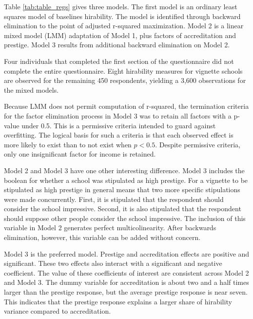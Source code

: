 \documentclass[review]{elsarticle}
\begin{document}


Table \ref{tab:table_regs} gives three models.
The first model is an ordinary least squares model of baselines hirability.
The model is identified through backward elimination to the point of adjusted r-squared maximization.
Model 2 is a linear mixed model (LMM) adaptation of Model 1,
plus factors of accreditation and prestige.
Model 3 results from additional backward elimination on Model 2.

Four individuals that completed the first section of the questionnaire
did not complete the entire questionnaire.
Eight hirability measures for vignette schools are observed for the
remaining 450 respondents, yielding a 3,600 observations for the mixed models.

Because LMM does not permit computation of r-squared,
the termination criteria for the factor elimination process in Model 3
was to retain all factors with a p-value under 0.5.
This is a permissive criteria intended to guard against overfitting.
The logical basis for such a criteria is that each observed effect is
more likely to exist than to not exist when $p < 0.5$.
Despite permissive criteria, only one insignificant factor for income is retained.


Model 2 and Model 3 have one other interesting difference.
Model 3 includes the boolean for whether a school was stipulated as high prestige.
For a vignette to be stipulated as high prestige in general
means that two more specific stipulations were made concurrently.
First, it is stipulated that the respondent should consider the school impressive.
Second, it is also stipulated that the respondent should suppose other people consider the school impressive.
The inclusion of this variable in Model 2 generates perfect multicolinearity.
After backwards elimination, however, this variable can be added without concern.

Model 3 is the preferred model.
Prestige and accreditation effects are positive and significant.
These two effects also interact with a significant and negative coefficient.
The value of these coefficients of interest are consistent across Model 2 and Model 3.
The dummy variable for accreditation is about two and a half times larger than the prestige response,
but the average prestige response is near seven.
This indicates that the prestige response explains a larger share of hirability variance compared to accreditation.
\end{document}
